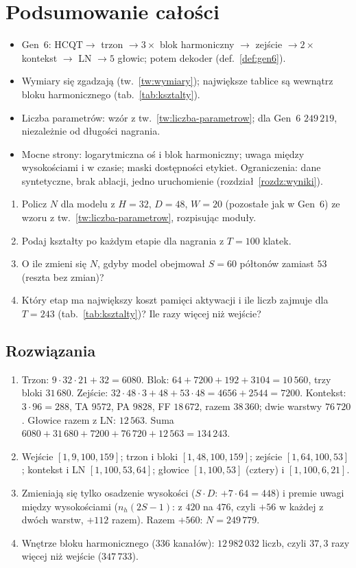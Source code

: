 \section*{Podsumowanie całości}
\begin{itemize}
\item Gen~6: $\mathrm{HCQT}\to$ trzon $\to3\times$ blok harmoniczny $\to$ zejście $\to2\times$ kontekst $\to$ LN $\to5$ głowic; potem dekoder (def.~\ref{def:gen6}).
\item Wymiary się zgadzają (tw.~\ref{tw:wymiary}); największe tablice są wewnątrz bloku harmonicznego (tab.~\ref{tab:ksztalty}).
\item Liczba parametrów: wzór z tw.~\ref{tw:liczba-parametrow}; dla Gen~6 $249\,219$, niezależnie od długości nagrania.
\item Mocne strony: logarytmiczna oś i blok harmoniczny; uwaga między wysokościami i w czasie; maski dostępności etykiet. Ograniczenia: dane syntetyczne, brak ablacji, jedno uruchomienie (rozdział~\ref{rozdz:wyniki}).
\end{itemize}

\begin{sprawdz}
\begin{enumerate}
\item Policz $N$ dla modelu z $H=32$, $D=48$, $W=20$ (pozostałe jak w Gen~6) ze wzoru z tw.~\ref{tw:liczba-parametrow}, rozpisując moduły.
\item Podaj kształty po każdym etapie dla nagrania z $T=100$ klatek.
\item O ile zmieni się $N$, gdyby model obejmował $S=60$ półtonów zamiast $53$ (reszta bez zmian)?
\item Który etap ma największy koszt pamięci aktywacji i ile liczb zajmuje dla $T=243$ (tab.~\ref{tab:ksztalty})? Ile razy więcej niż wejście?
\end{enumerate}
\end{sprawdz}

\subsection*{Rozwiązania}
\begin{enumerate}
\item Trzon: $9\cdot32\cdot21+32=6080$. Blok: $64+7200+192+3104=10\,560$, trzy bloki $31\,680$. Zejście: $32\cdot48\cdot3+48+53\cdot48=4656+2544=7200$. Kontekst: $3\cdot96=288$, TA $9572$, PA $9828$, FF $18\,672$, razem $38\,360$; dwie warstwy $76\,720$. Głowice razem z LN: $12\,563$. Suma $6080+31\,680+7200+76\,720+12\,563=134\,243$.
\item Wejście $[1,9,100,159]$; trzon i bloki $[1,48,100,159]$; zejście $[1,64,100,53]$; kontekst i LN $[1,100,53,64]$; głowice $[1,100,53]$ (cztery) i $[1,100,6,21]$.
\item Zmieniają się tylko osadzenie wysokości ($S\cdot D$: $+7\cdot64=448$) i premie uwagi między wysokościami ($n_h(2S-1)$: z $420$ na $476$, czyli $+56$ w każdej z dwóch warstw, $+112$ razem). Razem $+560$: $N=249\,779$.
\item Wnętrze bloku harmonicznego ($336$ kanałów): $12\,982\,032$ liczb, czyli $37{,}3$ razy więcej niż wejście ($347\,733$).
\end{enumerate}
